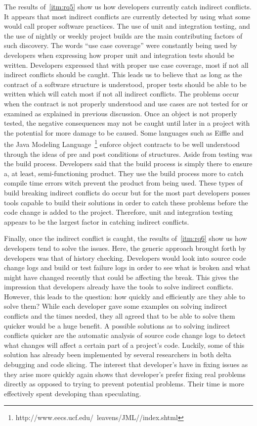 \documentclass[conference]{IEEEtran}
\begin{document}
The results of~\ref{itm:rq5} show us how developers currently catch indirect conflicts. It appears that most indirect conflicts are currently
detected by using what some would call proper software practices. The use of unit and integration testing, and the use of nightly or weekly
project builds are the main contributing factors of such discovery. The words ``use case coverage'' were constantly being used by developers
when expressing how proper unit and integration tests should be written. Developers expressed that with proper use case coverage, most if
not all indirect conflicts should be caught. This leads us to believe that as long as the contract of a software structure is understood,
proper tests should be able to be written which will catch most if not all indirect conflicts. The problems occur when the contract is
not properly understood and use cases are not tested for or examined as explained in previous discussion. Once an object is not properly
tested, the negative consequences may not be caught until later in a project with the potential for more damage to be caused. Some languages
such as Eiffle and the Java Modeling Language~\footnote{http://www.eecs.ucf.edu/~leavens/JML//index.shtml}
enforce object contracts to be well understood through the ideas of pre and post conditions of structures. Aside from testing
was the build process. Developers said that the build process is simply there to ensure a, at least, semi-functioning product. They use
the build process more to catch compile time errors witch prevent the product from being used. These types of build breaking indirect
conflicts do occur but for the most part developers posses tools capable to build their solutions in order to catch these problems before
the code change is added to the project. Therefore, unit and integration testing appears to be the largest factor in catching indirect conflicts.

Finally, once the indirect conflict is caught, the results of~\ref{itm:rq6} show us how developers tend to solve the issues. Here, the generic approach
brought forth by developers was that of history checking. Developers would look into source code change logs and build or test failure
logs in order to see what is broken and what might have changed recently that could be affecting the break. This gives the impression that
developers already have the tools to solve indirect conflicts. However, this leads to the question: how quickly and
efficiently are they able to solve them?
While each developer gave some examples on solving indirect conflicts and the times needed, they all agreed that to be able to solve them
quicker would be a huge benefit. A possible solutions as to solving indirect conflicts quicker are the automatic analysis of source code
change logs to detect what changes will affect a certain part of a project's code. Luckily, some of this solution has already been implemented
by several researchers in both delta debugging and code slicing. The interest that developer's have in fixing issues as they
arise more quickly again shows that developer's prefer fixing real problems directly as opposed to trying to prevent potential problems.
Their time is more effectively spent developing than speculating. 
\end{document}
